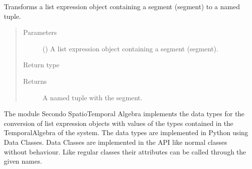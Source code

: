 \documentclass[letterpaper,10pt,english]{sphinxmanual}
\begin{document}

\begin{fulllineitems}
\label{\detokenize{index:secondodb.api.algebras.secondospatialalgebra.parse_segment}}
Transforms a list expression object containing a segment (segment) to a named tuple.
\begin{quote}\begin{description}
\item[{Parameters}] \leavevmode
{} () \textendash{} A list expression object containing a segment (segment).

\item[{Return type}] \leavevmode
{\hyperref[\detokenize{index:secondodb.api.algebras.secondospatialalgebra.Segment}]{}}

\item[{Returns}] \leavevmode
A named tuple with the segment.

\end{description}\end{quote}

\end{fulllineitems}



\label{\detokenize{index:module-secondodb.api.algebras.secondospatiotemporalalgebra}}
The module Secondo Spatio\sphinxhyphen{}Temporal Algebra implements the data types for the conversion of list expression objects with
values of the types contained in the TemporalAlgebra of the  system. The data types are implemented in Python
using Data Classes. Data Classes are implemented in the API like normal classes without behaviour.
Like regular classes their attributes can be called through the given names.
\end{document}
